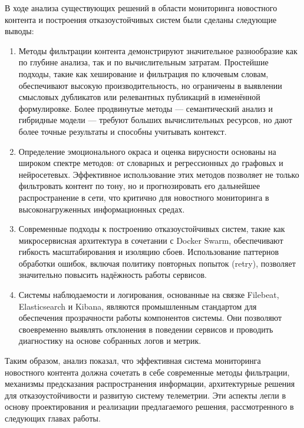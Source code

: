 В ходе анализа существующих решений в области мониторинга новостного контента и построения отказоустойчивых систем были сделаны следующие выводы:
\begin{enumerate}
    \item Методы фильтрации контента демонстрируют значительное разнообразие как по глубине анализа, так и по вычислительным затратам. Простейшие подходы, такие как хеширование и фильтрация по ключевым словам, обеспечивают высокую производительность, но ограничены в выявлении смысловых дубликатов или релевантных публикаций в изменённой формулировке. Более продвинутые методы — семантический анализ и гибридные модели — требуют больших вычислительных ресурсов, но дают более точные результаты и способны учитывать контекст.
    \item Определение эмоционального окраса и оценка вирусности основаны на широком спектре методов: от словарных и регрессионных до графовых и нейросетевых. Эффективное использование этих методов позволяет не только фильтровать контент по тону, но и прогнозировать его дальнейшее распространение в сети, что критично для новостного мониторинга в высоконагруженных информационных средах.
    \item Современные подходы к построению отказоустойчивых систем, такие как микросервисная архитектура в сочетании с Docker Swarm, обеспечивают гибкость масштабирования и изоляцию сбоев. Использование паттернов обработки ошибок, включая политику повторных попыток (retry), позволяет значительно повысить надёжность работы сервисов.
    \item Системы наблюдаемости и логирования, основанные на связке Filebeat, Elasticsearch и Kibana, являются промышленным стандартом для обеспечения прозрачности работы компонентов системы. Они позволяют своевременно выявлять отклонения в поведении сервисов и проводить диагностику на основе собранных логов и метрик.
\end{enumerate}

Таким образом, анализ показал, что эффективная система мониторинга новостного контента должна сочетать в себе современные методы фильтрации, механизмы предсказания распространения информации, архитектурные решения для отказоустойчивости и развитую систему телеметрии. Эти аспекты легли в основу проектирования и реализации предлагаемого решения, рассмотренного в следующих главах работы.
